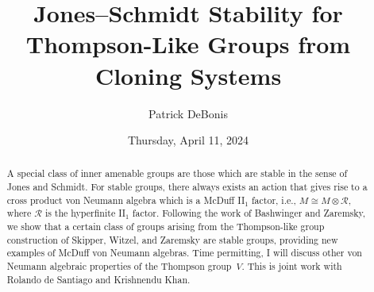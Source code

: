 \documentclass{UAmathtalk}
\author{Patrick DeBonis}
\title{Jones–Schmidt Stability for Thompson-Like Groups from Cloning Systems}
\date{Thursday, April 11, 2024}
\begin{document}
\maketitle

\begin{abstract}
A special class of inner amenable groups are those which are stable in the sense of Jones and Schmidt. For stable groups, there always exists an action that gives rise to a cross product von Neumann algebra which is a McDuff II$_1$ factor, i.e., $M \cong M \otimes \mathcal{R},$ where $\mathcal{R}$ is the hyperfinite II$_1$ factor. Following the work of Bashwinger and Zaremsky, we show that a certain class of groups arising from the Thompson-like group construction of Skipper, Witzel, and Zaremsky are stable groups, providing new examples of McDuff von Neumann algebras. Time permitting, I will discuss other von Neumann algebraic properties of the Thompson group~$V$. This is joint work with Rolando de Santiago and Krishnendu Khan.
\end{abstract}
\end{document}
